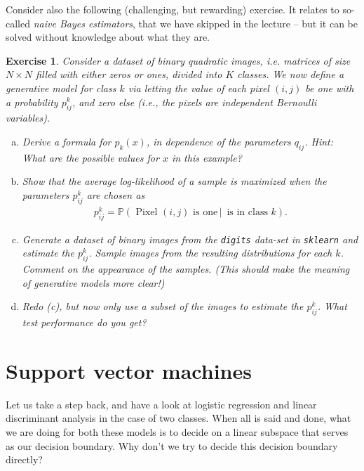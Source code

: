 \documentclass{article}
\newtheorem{exercise}{Exercise}
\begin{document}
Consider also the following (challenging, but rewarding) exercise. It relates to so-called \emph{naive Bayes estimators}, that we have skipped in the lecture -- but it can be solved without knowledge about what they are.
\begin{exercise}
    Consider a dataset of binary quadratic images, i.e. matrices of size $N\times N$ filled with either zeros or ones, divided into $K$ classes. We now define a generative model for class $k$ via letting the value of each pixel $(i,j)$ be one with a probability $p_{ij}^k$, and zero else (i.e., the pixels are independent Bernoulli variables).
    \begin{enumerate}[(a)]
        \item Derive a formula for $p_k(x)$, in dependence of the parameters $q_{ij}$. \emph{Hint: What are the possible values for $x$ in this example?}
        \item Show that the average log-likelihood of a sample is maximized when the parameters $p_{ij}^k$ are chosen as
        \begin{align*}
            p_{ij}^k = \mathbb{P}(\text{ Pixel $(i,j)$ is one} \, \vert \,  \text{ is in class } k).
        \end{align*}
        \item Generate a dataset of binary images from the \texttt{digits} data-set in \texttt{sklearn} and estimate the $p_{ij}^k$. Sample images from the resulting distributions for each $k$. Comment on the appearance of the samples. (This should make the meaning of  \emph{generative} models more clear!)
        \item Redo (c), but now only use a subset of the images to estimate the $p_{ij}^k$. What test performance do you get?
    \end{enumerate}
\end{exercise}




\section{Support vector machines}
Let us take a step back, and have a look at logistic regression and linear discriminant analysis in the case of two classes. When all is said and done, what we are doing for both these models is to decide on a linear subspace that serves as our decision boundary. Why don't we try to decide this decision boundary directly?
\end{document}
